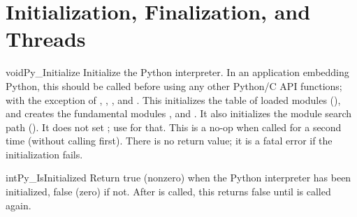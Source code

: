 \chapter{Initialization, Finalization, and Threads
         \label{initialization}}

\begin{cfuncdesc}{void}{Py_Initialize}{}
  Initialize the Python interpreter.  In an application embedding 
  Python, this should be called before using any other Python/C API
  functions; with the exception of
  ,
  ,
  ,
  and .
  This initializes the table of loaded modules (),
  and
  creates the fundamental modules
  ,
   and
  .  It also initializes the module
  search path ().
  It does not set ; use
   for that.  This
  is a no-op when called for a second time (without calling
   first).  There is
  no return value; it is a fatal error if the initialization fails.
\end{cfuncdesc}

\begin{cfuncdesc}{int}{Py_IsInitialized}{}
  Return true (nonzero) when the Python interpreter has been
  initialized, false (zero) if not.  After 
  is called, this returns false until  is
  called again.
\end{cfuncdesc}

